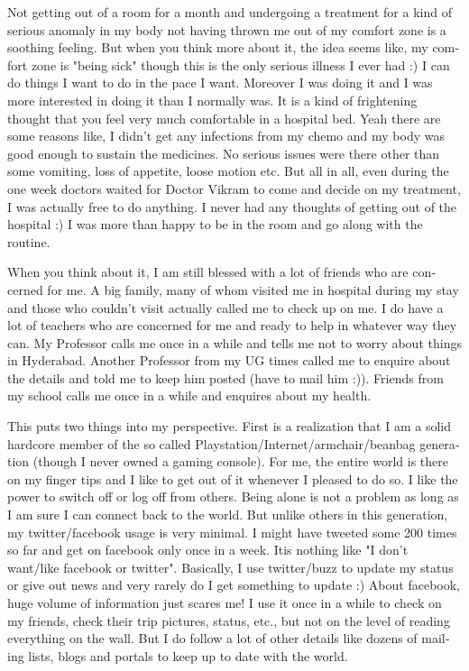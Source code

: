 \begin{english}
Not getting out of a room for a month and undergoing a treatment for a kind of serious anomaly in my body not 
having thrown me out of my comfort zone is a soothing feeling. But when you think more about it, the idea seems 
like, my comfort zone is "being sick" though this is the only serious illness I ever had :) I can do things I want to 
do in the pace I want. Moreover I was doing it and I was more interested in doing it than I normally was. It is a 
kind of frightening thought that you feel very much comfortable in a hospital bed. Yeah there are some reasons 
like, I didn't get any infections from my chemo and my body was good enough to sustain the medicines. No serious 
issues were there other than some vomiting, loss of appetite, loose motion etc. But all in all, even during the one 
week doctors waited for Doctor Vikram to come and decide on my treatment, I was actually free to do anything. 
I never had any thoughts of getting out of the hospital :) I was more than happy to be in the room and go along 
with the routine. 

When you think about it, I am still blessed with a lot of friends who are concerned for me. A big family, many of 
whom visited me in hospital during my stay and those who couldn't visit actually called me to check up on me. 
I do have a lot of teachers who are concerned for me and ready to help in whatever way they can. My Professor 
calls me once in a while and tells me not to worry about things in Hyderabad. Another Professor from my UG times 
called me to enquire about the details and told me to keep him posted (have to mail him :)). Friends from my 
school calls me once in a while and enquires about my health.

This puts two things into my perspective. First is a realization that I am a solid hardcore member of the so called 
Playstation/Internet/armchair/beanbag generation (though I never owned a gaming console). For me, the entire 
world is there on my finger tips and I like to get out of it whenever I pleased to do so. I like the power to switch off 
or log off from others. Being alone is not a problem as long as I am sure I can connect back to the world. But unlike 
others in this generation, my twitter/facebook usage is very minimal. I might have tweeted some 200 times so far 
and get on facebook only once in a week. Itis nothing like "I don't want/like facebook or twitter". Basically, I use 
twitter/buzz to update my status or give out news and very rarely do I get something to update :) About facebook, 
huge volume of information just scares me! I use it once in a while to check on my friends, check their trip pictures, 
status, etc., but not on the level of reading everything on the wall. But I do follow a lot of other details like dozens 
of mailing lists, blogs and portals to keep up to date with the world. 


\end{english}
